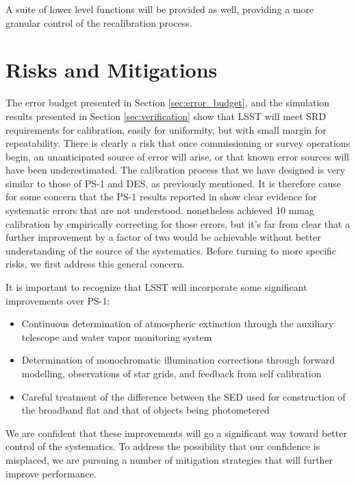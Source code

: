 \documentclass[12pt,preprint]{aastex}
\begin{document}
A suite of lower level functions will be provided as well, providing a more granular control of the recalibration process.

\section{Risks and Mitigations}
\label{sec:risks}
The error budget presented in Section \ref{sec:error_budget}, and the simulation results presented in Section \ref{sec:verification} show that
LSST will meet SRD requirements for calibration, easily for uniformity, but with small margin for repeatability.   
There is clearly a risk
that once commissioning or survey operations begin, an unanticipated source of error will arise, or
that known error sources will have been underestimated.
The calibration process that we have designed is very similar to those of PS-1 and DES, as previously mentioned.  It is therefore
cause for some concern that the PS-1 results reported in \citep{Tonry2012} show clear evidence for systematic errors 
that are not understood.  \cite{Schlafly2012} nonetheless achieved 10 mmag calibration by empirically correcting for those errors,
but it's far from clear that a further improvement by a factor of two would be achievable without better understanding of the 
source of the systematics. 
Before turning to more specific risks, we first address this general concern.

It is important to recognize that LSST will incorporate some significant improvements over PS-1:

\begin{itemize}
\item{Continuous determination of atmospheric extinction through the auxiliary telescope and water
vapor monitoring system}
\item{Determination of monochromatic illumination corrections through forward modelling, observations of
star grids, and feedback from self calibration}
\item{Careful treatment of the difference between the SED used for construction of the broadband flat and 
that of objects being photometered}
\end{itemize}

We are confident that these improvements will go a significant way toward better control of the systematics.  
To address the possibility
that our confidence is misplaced, we are pursuing a number of mitigation strategies that will 
further improve performance.
\end{document}

